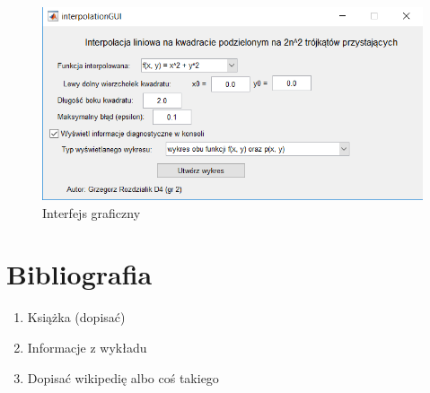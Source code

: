 \documentclass[12pt]{article}
\begin{document}
	\begin{figure}
		\includegraphics[scale=1]{images/gui.png}
		\caption{Interfejs graficzny}
	\end{figure}
	
	\section{Bibliografia}
	\begin{enumerate}
		\item Książka (dopisać)
		\item Informacje z wykładu
		\item Dopisać wikipedię albo coś takiego
	\end{enumerate}
	
\end{document}
